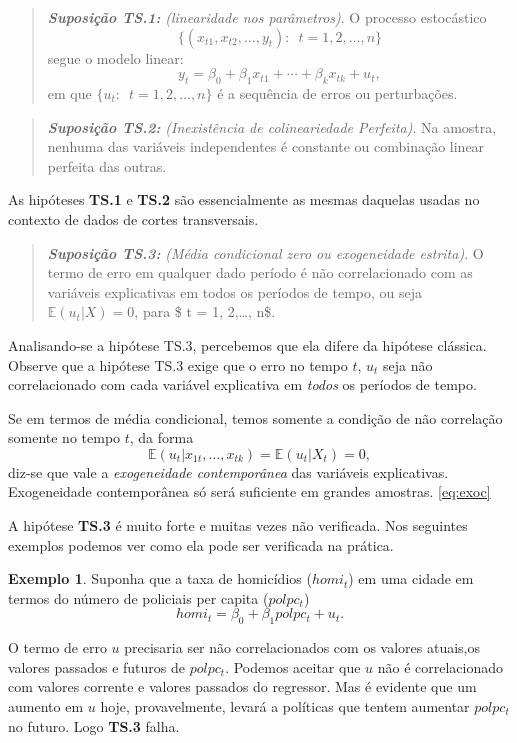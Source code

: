 \documentclass[
]{book}
\theoremstyle{definition}
\theoremstyle{definition}
\newtheorem{example}{Exemplo}[chapter]
\theoremstyle{definition}
\theoremstyle{remark}
\begin{document}
\begin{quote}
\textbf{\emph{Suposição TS.1:}} \emph{(linearidade nos parâmetros)}.
O processo estocástico
\[\{(x_{t1}, x_{t2},\ldots, y_t):\,\,\, t = 1, 2,\ldots, n\}\]
segue o modelo linear:
\[y_t = \beta_0 + \beta_1 x_{t1} + \cdots + \beta_k x_{tk}+u_t,\]
em que \(\{u_t:\,\,\,t=1,2,\ldots,n\}\) é a sequência de erros ou perturbações.
\end{quote}

\begin{quote}
\textbf{\emph{Suposição TS.2:}} \emph{(Inexistência  de colineariedade Perfeita)}. Na amostra, nenhuma das variáveis independentes é constante ou combinação linear perfeita das outras.
\end{quote}

As hipóteses \textbf{TS.1} e \textbf{TS.2} são essencialmente as mesmas daquelas usadas no contexto de
dados de cortes transversais.

\begin{quote}
\textbf{\emph{Suposição TS.3:}} \emph{(Média condicional zero ou exogeneidade estrita)}. O termo de erro em qualquer dado período é não correlacionado com as variáveis explicativas em todos os períodos de tempo, ou seja \(\mathbb{E} (u_t | X) = 0\), para \$ t = 1, 2,\ldots, n\$.
\end{quote}

Analisando-se a hipótese TS.3, percebemos que ela difere da hipótese clássica.
Observe que a hipótese TS.3 exige que o erro no tempo \(t\), \(u_t\) seja não correlacionado
com cada variável explicativa em \emph{todos} os períodos de tempo.

Se em termos de média condicional, temos somente a condição de não correlação somente no tempo
\(t\), da forma
\begin{equation}
\mathbb{E}(u_t|x_{1t},\ldots,x_{tk})=\mathbb{E} (u_t | X_t) = 0,
\label{eq:exoc}
\end{equation}
diz-se que vale a \emph{exogeneidade contemporânea} das variáveis explicativas. Exogeneidade contemporânea só será suficiente em grandes amostras.
\eqref{eq:exoc}

A hipótese \textbf{TS.3} é muito forte e muitas vezes não verificada. Nos seguintes exemplos podemos ver como ela pode ser verificada na prática.

\begin{example}
\protect\hypertarget{exm:examphomic}{}{\label{exm:examphomic} }Suponha que a taxa de homicídios (\(homi_t\)) em uma cidade em termos do número de policiais per capita (\(polpc_t\))
\[homi_t = \beta_0 + \beta_1 polpc_t + u_t.\]

O termo de erro \(u\) precisaria ser não correlacionados com os valores atuais,os valores passados e futuros de \(polpc_t\). Podemos aceitar que \(u\) não é correlacionado com valores corrente e valores passados do regressor. Mas é evidente que um aumento em \(u\) hoje, provavelmente, levará a políticas que tentem aumentar \(polpc_t\) no futuro. Logo \textbf{TS.3} falha.
\end{example}
\end{document}
